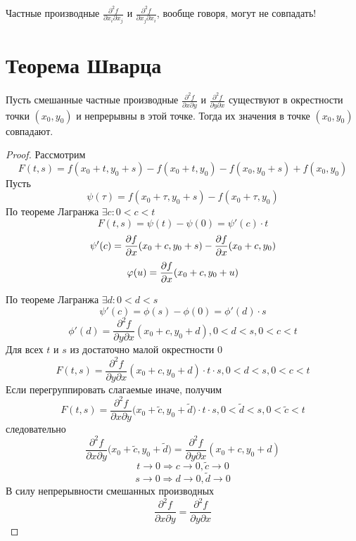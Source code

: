     \begin{mention}
    	Частные производные $\frac{\partial^2 f}{\partial x_i \partial x_j}$ и $\frac{\partial^2 f}{\partial x_j \partial x_i}$, вообще говоря, могут не совпадать!
    \end{mention}
    
    \section{Теорема Шварца}
    
    \begin{theorem}[Шварц]
    	Пусть смешанные частные производные $\frac{\partial^2 f}{\partial x \partial y}$ и $\frac{\partial^2 f}{\partial y \partial x}$ существуют в окрестности точки $(x_0, y_0)$ и непрерывны в этой точке. Тогда их значения в точке $(x_0, y_0)$ совпадают.
    \end{theorem}
    
    \begin{proof}
    	Рассмотрим
    	\[ F(t, s) = f(x_0 + t, y_0 + s) - f(x_0 + t, y_0) - f(x_0, y_0 + s) + f(x_0, y_0) \]
    	Пусть
    	\[ \psi(\tau) = f(x_0 + \tau, y_0 + s) - f(x_0 + \tau, y_0) \]
    	По теореме Лагранжа $\exists c: 0 < c < t$
    	\[ F(t, s) = \psi(t) - \psi(0) = \psi'(c) \cdot t \]
    	\[ \psi'(c) = \frac{\partial f}{\partial x}(x_0 + c, y_0 + s) - \frac{\partial f}{\partial x}(x_0 + c, y_0) \]
    	\[ \varphi(u) = \frac{\partial f}{\partial x}(x_0 + c, y_0 + u) \]
    	
    	По теореме Лагранжа $\exists d: 0 < d < s$
    	\[ \psi'(c) = \phi(s) - \phi(0) = \phi'(d) \cdot s \]
    	\[ \phi'(d) = \frac{\partial^2 f}{\partial y \partial x}(x_0 + c, y_0 + d), 0 < d < s, 0 < c < t \]
    	Для всех $t$ и $s$ из достаточно малой окрестности 0
    	\[ F(t, s) = \frac{\partial^2 f}{\partial y \partial x}(x_0 + c, y_0 + d) \cdot t \cdot s, 0 < d < s, 0 < c < t \]
    	Если перегруппировать слагаемые иначе, получим
    	\[ F(t, s) = \frac{\partial^2 f}{\partial x \partial y} \big(x_0 + \widetilde{c}, y_0 + \widetilde{d} \big) \cdot t \cdot s, 0 < \widetilde{d} < s, 0 < \widetilde{c} < t \]
    	следовательно
    	\[ \frac{\partial^2 f}{\partial x \partial y} \big(x_0 + \widetilde{c}, y_0 + \widetilde{d} \big) = \frac{\partial^2 f}{\partial y \partial x} (x_0 + c, y_0 + d) \]
    	\[ t \to 0 \Rightarrow c \to 0, \widetilde{c} \to 0 \]
    	\[ s \to 0 \Rightarrow d \to 0, \widetilde{d} \to 0 \]
    	В силу непрерывности смешанных производных
    	\[ \frac{\partial^2 f}{\partial x \partial y} = \frac{\partial^2 f}{\partial y \partial x} \]
    \end{proof}

